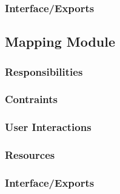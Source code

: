 \subsubsection{Interface/Exports}
\label{sec:exports}

\subsection{Mapping Module}
\label{sec:mapping_design}

\subsubsection{Responsibilities}
\label{sec:responsibilities}

\subsubsection{Contraints}
\label{sec:constraints}

\subsubsection{User Interactions}
\label{sec:interactions}

\subsubsection{Resources}
\label{sec:resources}

\subsubsection{Interface/Exports}
\label{sec:exports}

